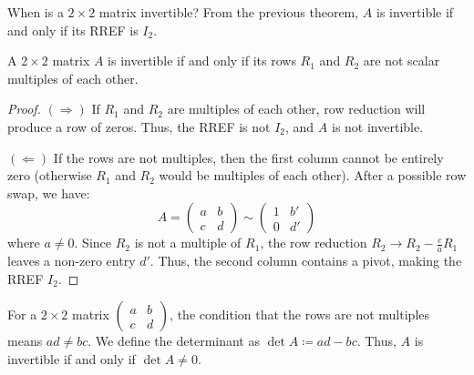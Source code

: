 \documentclass[../linear_algebra_and_groups.tex]{subfiles}
\begin{document}
When is a $2\times 2$ matrix invertible? From the previous theorem, $A$ is invertible if and only if its RREF is $I_2$.

\begin{proposition}
    \begin{shaded*}
        A $2 \times 2$ matrix $A$ is invertible if and only if its rows $R_1$ and $R_2$ are not scalar multiples of each other.
    \end{shaded*}
\end{proposition}
\begin{proof}
    $(\Rightarrow)$ If $R_1$ and $R_2$ are multiples of each other, row reduction will produce a row of zeros. Thus, the RREF is not $I_2$, and $A$ is not invertible.
    
    $(\Leftarrow)$ If the rows are not multiples, then the first column cannot be entirely zero (otherwise $R_1$ and $R_2$ would be multiples of each other). After a possible row swap, we have:
    \[ A = \begin{pmatrix} a & b \\ c & d \end{pmatrix} \sim \begin{pmatrix} 1 & b' \\ 0 & d' \end{pmatrix} \]
    where $a \neq 0$. Since $R_2$ is not a multiple of $R_1$, the row reduction $R_2 \to R_2 - \frac{c}{a}R_1$ leaves a non-zero entry $d'$. Thus, the second column contains a pivot, making the RREF $I_2$.
    \qedhere
\end{proof}

\begin{remark}
    For a $2 \times 2$ matrix $\begin{pmatrix} a & b \\ c & d \end{pmatrix}$, the condition that the rows are not multiples means $ad \neq bc$. We define the determinant as $\det A \coloneqq ad - bc$. Thus, $A$ is invertible if and only if $\det A \neq 0$.
\end{remark}
\end{document}
